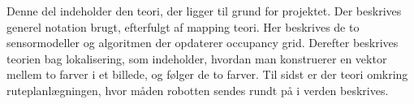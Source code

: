 Denne del indeholder den teori, der ligger til grund for projektet.
Der beskrives generel notation brugt, efterfulgt af mapping teori.
Her beskrives de to sensormodeller og algoritmen der opdaterer occupancy grid.
Derefter beskrives teorien bag lokalisering, som indeholder, hvordan man konstruerer en vektor mellem to farver i et billede, og følger de to farver.
Til sidst er der teori omkring ruteplanlægningen, hvor måden robotten sendes rundt på i verden beskrives.